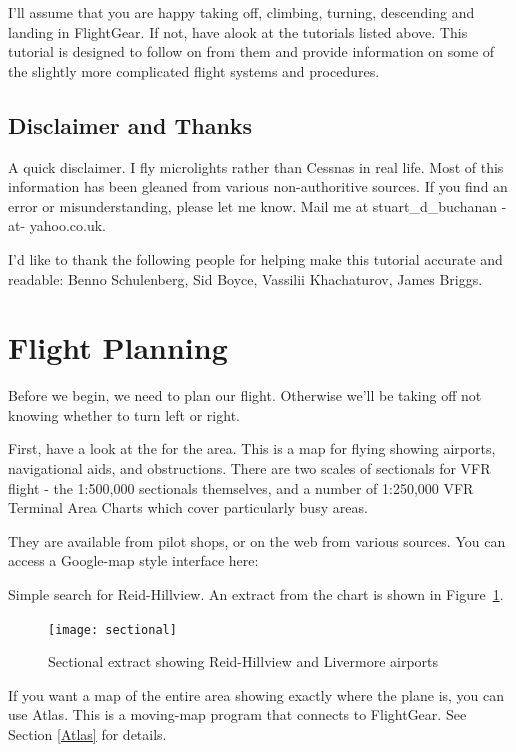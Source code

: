 I'll assume that you are happy taking off, climbing, turning, descending
and landing in FlightGear. If not, have alook at the tutorials listed above.
This tutorial is designed to follow on from them and provide information on
some of the slightly more complicated flight systems and procedures.

\subsection{Disclaimer and Thanks}

A quick disclaimer. I fly microlights rather than Cessnas in real life. Most of
this information has been gleaned from various non-authoritive sources. If you
find an error or misunderstanding, please let me know. Mail me at
stuart\_d\_buchanan -at- yahoo.co.uk.

I'd like to thank the following people for helping make this tutorial accurate
and readable: Benno Schulenberg, Sid Boyce, Vassilii Khachaturov, James Briggs.

\section{Flight Planning}

Before we begin, we need to plan our flight.
Otherwise we'll be taking off not knowing whether to turn left or right.

First, have a look at the  for the area. This is a map for
flying showing airports, navigational aids, and obstructions.
There are two scales of sectionals for VFR flight -
the 1:500,000 sectionals themselves, and a number of
1:250,000 VFR Terminal Area Charts which cover particularly busy areas.

They are available from pilot shops, or on the web from various sources.
You can access a Google-map style interface here:

\medskip
{}
\medskip

Simple search for Reid-Hillview. An extract from the chart is shown in Figure~\ref{sectional}.

\begin{figure}[!htp]
\centering
\texttt{[image: sectional]}
\caption{Sectional extract showing Reid-Hillview and Livermore airports\label{sectional}}
\end{figure}

If you want a map of the entire area showing exactly where the plane is,
you can use Atlas.
This is a moving-map program that connects to FlightGear. See Section \ref{Atlas} for details.

